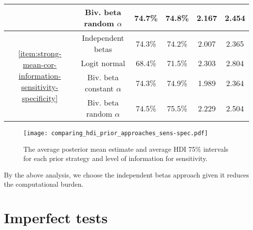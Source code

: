 \begin{table}[tbp]
\begin{tabular}{cccccc}
                                                                                        & Biv. beta random $\alpha$         & 74.7\%        & 74.8\%        & 2.167         & 2.454         \\\hline
    \multirow{4}{*}{\autoref{item:strong-mean-cor-information-sensitivity-specificity}} & Independent betas                 & 74.3\%        & 74.2\%        & 2.007         & 2.365         \\
                                                                                        & Logit normal                      & 68.4\%        & 71.5\%        & 2.303         & 2.804         \\
                                                                                        & Biv. beta constant $\alpha$       & 74.3\%        & 74.9\%        & 1.989         & 2.364         \\
                                                                                        & Biv. beta random $\alpha$         & 74.5\%        & 75.5\%        & 2.229         & 2.504         \\ \hline
  \end{tabular}
\end{table}

\begin{figure}
  \centering
  \caption{\label{fig:comparing_hdi_prior_approaches_sens-spec}The average
    posterior mean estimate and average HDI 75\% intervals
    for each prior strategy and level of information for sensitivity.}
  \texttt{[image: comparing\_hdi\_prior\_approaches\_sens-spec.pdf]}
\end{figure}

By the above analysis, we choose the independent betas approach given it
reduces the computational burden.

\section{Imperfect tests}

